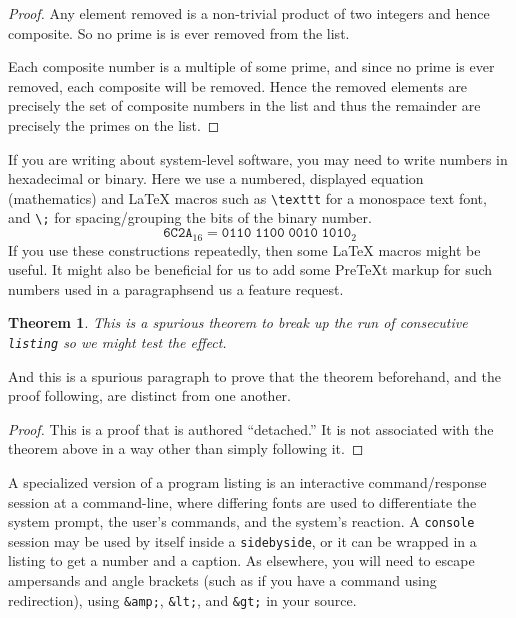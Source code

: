 \documentclass{amsart}
\theoremstyle{plain}%
\newtheorem{theorem}{Theorem}[section]
\theoremstyle{definition}%
\theoremstyle{remark}%
\newcommand{\mono}[1]{\texttt{#1}}
\numberwithin{equation}{section}
\begin{document}
\begin{proof}\label{algorithm-sieve-eratosthenes-3}%
Any element removed is a non-trivial product of two integers and hence composite.  So no prime is is ever removed from the list.%
\par
Each composite number is a multiple of some prime, and since no prime is ever removed, each composite will be removed.  Hence the removed elements are precisely the set of composite numbers in the list and thus the remainder are precisely the primes on the list.%
\end{proof}
%
If you are writing about system-level software, you may need to write numbers in hexadecimal or binary.  Here we use a numbered, displayed equation (mathematics) and \LaTeX{} macros such as \mono{\textbackslash{}texttt} for a monospace text font, and \mono{\textbackslash{};} for spacing\slash{}grouping the bits of the binary number.%
\begin{equation}
\texttt{6C2A}_{16} = \texttt{0110}\;\texttt{1100}\;\texttt{0010}\;\texttt{1010}_{2}\label{section-programs-24-4}
\end{equation}
If you use these constructions repeatedly, then some \LaTeX{} macros might be useful.  It might also be beneficial for us to add some PreTeXt markup for such numbers used in a paragraph\textemdash{}send us a feature request.%
\begin{theorem}\label{theorem-detached}%
%
This is a spurious theorem to break up the run of consecutive \mono{listing} so we might test the effect.%
\end{theorem}
And this is a spurious paragraph to prove that the theorem beforehand, and the proof following, are distinct from one another.%
\begin{proof}\label{section-programs-27}%
This is a proof that is authored ``detached.''  It is not associated with the theorem above in a way other than simply following it.%
\end{proof}
A specialized version of a program listing is an interactive command\slash{}response session at a command-line, where differing fonts are used to differentiate the system prompt, the user's commands, and the system's reaction.  A   \mono{console} session may be used by itself inside a \mono{sidebyside}, or it can be wrapped in a listing to get a number and a caption.  As elsewhere, you will need to escape ampersands and angle brackets (such as if you have a command using redirection), using \mono{\&amp;}, \mono{\&lt;}, and \mono{\&gt;} in your source.%
\end{document}
